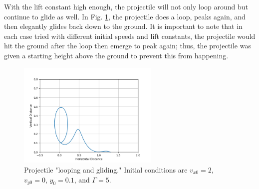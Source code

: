 \documentclass[12pt]{iopart} %
\begin{document}
With the lift constant high enough, the projectile will not only loop around but continue to glide as well.
In Fig. \ref{fig:lift3}, the projectile does a loop, peaks again, and then elegantly glides back down to the ground.
It is important to note that in each case tried with different initial speeds and lift constants, the projectile would hit the ground after the loop then emerge to peak again; thus, the projectile was given a starting height above the ground to prevent this from happening.

\begin{figure}[h!tbp]
  \begin{center}
 \item[]\includegraphics[width=0.6\textwidth]{lift3.png}
  \caption{\label{fig:lift3}
  Projectile "looping and gliding."
  Initial conditions are $v_{x0} = 2$, $v_{y0} = 0$, $y_{0} = 0.1$, and $\Gamma = 5$.
  }
  \end{center}
\end{figure}
\end{document}
